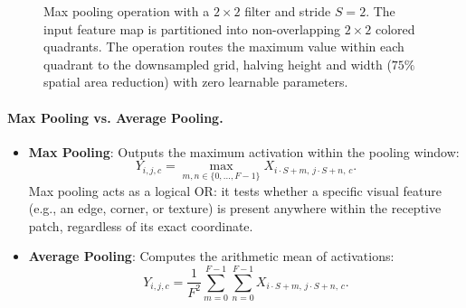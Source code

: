 \begin{figure}[H]
\caption{Max pooling operation with a $2 \times 2$ filter and stride $S = 2$. The input feature map is partitioned into non-overlapping $2 \times 2$ colored quadrants. The operation routes the maximum value within each quadrant to the downsampled grid, halving height and width ($75\%$ spatial area reduction) with zero learnable parameters.}
\label{fig:max_pooling}
\end{figure}

\paragraph{Max Pooling vs. Average Pooling.}
\begin{itemize}
  \item \textbf{Max Pooling}: Outputs the maximum activation within the pooling window:
    \begin{equation}
    Y_{i, j, c} = \max_{m, n \in \{0, \dots, F-1\}} X_{i \cdot S + m, \, j \cdot S + n, \, c}.
    \label{eq:max_pooling_formula}
    \end{equation}
    Max pooling acts as a logical OR: it tests whether a specific visual feature (e.g., an edge, corner, or texture) is present anywhere within the receptive patch, regardless of its exact coordinate.
  \item \textbf{Average Pooling}: Computes the arithmetic mean of activations:
    \begin{equation}
    Y_{i, j, c} = \frac{1}{F^2} \sum_{m=0}^{F-1} \sum_{n=0}^{F-1} X_{i \cdot S + m, \, j \cdot S + n, \, c}.
    \label{eq:avg_pooling_formula}
    \end{equation}
\end{itemize}

